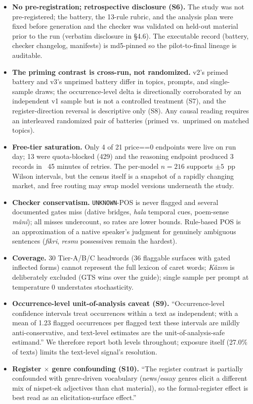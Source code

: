 \documentclass[11pt]{article}
\begin{document}
\begin{itemize}
\item \textbf{No pre-registration; retrospective disclosure (S6).} The study was not pre-registered; the battery, the 13-rule rubric, and the analysis plan were fixed before generation and the checker was validated on held-out material prior to the run (verbatim disclosure in \S4.6). The executable record (battery, checker changelog, manifests) is md5-pinned so the pilot-to-final lineage is auditable.
\item \textbf{The priming contrast is cross-run, not randomized.} v2's primed battery and v3's unprimed battery differ in topics, prompts, and single-sample draws; the occurrence-level delta is directionally corroborated by an independent v1 sample but is not a controlled treatment (S7), and the register-direction reversal is descriptive only (S8). Any causal reading requires an interleaved randomized pair of batteries (primed vs.\ unprimed on matched topics).
\item \textbf{Free-tier saturation.} Only 4 of 21 price==0 endpoints were live on run day; 13 were quota-blocked (429) and the reasoning endpoint produced 3 records in ~45 minutes of retries. The per-model $n{=}216$ supports $\pm5$~pp Wilson intervals, but the census itself is a snapshot of a rapidly changing market, and free routing may swap model versions underneath the study.
\item \textbf{Checker conservatism.} \texttt{UNKNOWN}-POS is never flagged and several documented gates miss (dative bridges, \emph{hala} temporal cues, poem-sense \emph{m{\^a}ni}); all misses undercount, so rates are lower bounds. Rule-based POS is an approximation of a native speaker's judgment for genuinely ambiguous sentences (\emph{fikri}, \emph{resm{\i}} possessives remain the hardest).
\item \textbf{Coverage.} 30 Tier-A/B/C headwords (36 flaggable surfaces with gated inflected forms) cannot represent the full lexicon of caret words; \emph{K{\^a}z{\i}m} is deliberately excluded (GTS wins over the guide); single sample per prompt at temperature 0 understates stochasticity.
\item \textbf{Occurrence-level unit-of-analysis caveat (S9).} ``Occurrence-level confidence intervals treat occurrences within a text as independent; with a mean of 1.23 flagged occurrences per flagged text these intervals are mildly anti-conservative, and text-level estimates are the unit-of-analysis-safe estimand.'' We therefore report both levels throughout; exposure itself (27.0\% of texts) limits the text-level signal's resolution.
\item \textbf{Register $\times$ genre confounding (S10).} ``The register contrast is partially confounded with genre-driven vocabulary (news/essay genres elicit a different mix of nispet-ek adjectives than chat material), so the formal-register effect is best read as an elicitation-surface effect.''
\end{itemize}
\end{document}
